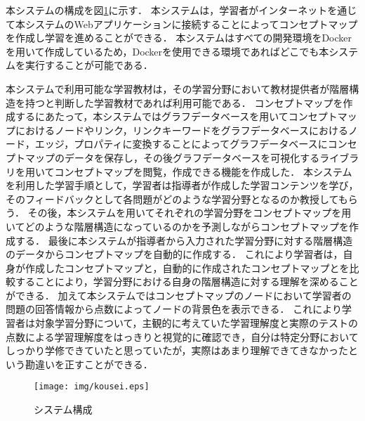 本システムの構成を図\ref{fig:kousei}に示す．
本システムは，学習者がインターネットを通じて本システムのWebアプリケーションに接続することによってコンセプトマップを作成し学習を進めることができる．
本システムはすべての開発環境をDockerを用いて作成しているため，Dockerを使用できる環境であればどこでも本システムを実行することが可能である．

本システムで利用可能な学習教材は，その学習分野において教材提供者が階層構造を持つと判断した学習教材であれば利用可能である．
コンセプトマップを作成するにあたって，本システムではグラフデータベースを用いてコンセプトマップにおけるノードやリンク，リンクキーワードをグラフデータベースにおけるノード，エッジ，プロパティに変換することによってグラフデータベースにコンセプトマップのデータを保存し，その後グラフデータベースを可視化するライブラリを用いてコンセプトマップを閲覧，作成できる機能を作成した．
本システムを利用した学習手順として，学習者は指導者が作成した学習コンテンツを学び，そのフィードバックとして各問題がどのような学習分野となるのか教授してもらう．
その後，本システムを用いてそれぞれの学習分野をコンセプトマップを用いてどのような階層構造になっているのかを予測しながらコンセプトマップを作成する．
最後に本システムが指導者から入力された学習分野に対する階層構造のデータからコンセプトマップを自動的に作成する．
これにより学習者は，自身が作成したコンセプトマップと，自動的に作成されたコンセプトマップとを比較することにより，学習分野における自身の階層構造に対する理解を深めることができる．
加えて本システムではコンセプトマップのノードにおいて学習者の問題の回答情報から点数によってノードの背景色を表示できる．
これにより学習者は対象学習分野について，主観的に考えていた学習理解度と実際のテストの点数による学習理解度をはっきりと視覚的に確認でき，自分は特定分野においてしっかり学修できていたと思っていたが，実際はあまり理解できてきなかったという勘違いを正すことができる．
\begin{figure}[htbp]
\begin{center}
\texttt{[image: img/kousei.eps]}
\end{center}
\caption{システム構成}
\label{fig:kousei}
\end{figure}